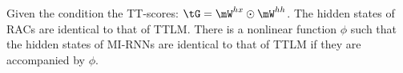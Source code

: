 









\begin{claim}
\label{cm: G and RACs} Given the condition the TT-scores: $\tG = \mW^{hx} \odot \mW^{hh}$. 
The hidden states of RACs are identical to that of TTLM. There is a nonlinear function $\phi$ such that the hidden states of MI-RNNs are identical to that of TTLM if they are accompanied by $\phi$.   
\end{claim}



